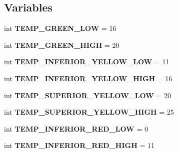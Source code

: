 \subsection*{Variables}
\begin{DoxyCompactItemize}
\item 
\mbox{\label{namespacegraph__functions_abdce6f1710c183398e9bce394c6a04cb}} 
int {\bfseries T\+E\+M\+P\+\_\+\+G\+R\+E\+E\+N\+\_\+\+L\+OW} = 16
\item 
\mbox{\label{namespacegraph__functions_a8d464961e9217805d26bb0a8985d6bf5}} 
int {\bfseries T\+E\+M\+P\+\_\+\+G\+R\+E\+E\+N\+\_\+\+H\+I\+GH} = 20
\item 
\mbox{\label{namespacegraph__functions_a0d0e29e53942695dd4949552b0214d70}} 
int {\bfseries T\+E\+M\+P\+\_\+\+I\+N\+F\+E\+R\+I\+O\+R\+\_\+\+Y\+E\+L\+L\+O\+W\+\_\+\+L\+OW} = 11
\item 
\mbox{\label{namespacegraph__functions_a6b6d4b0c7c88edb927ef234701ae21c7}} 
int {\bfseries T\+E\+M\+P\+\_\+\+I\+N\+F\+E\+R\+I\+O\+R\+\_\+\+Y\+E\+L\+L\+O\+W\+\_\+\+H\+I\+GH} = 16
\item 
\mbox{\label{namespacegraph__functions_af4b14f12932fa5e9071ab1837591b593}} 
int {\bfseries T\+E\+M\+P\+\_\+\+S\+U\+P\+E\+R\+I\+O\+R\+\_\+\+Y\+E\+L\+L\+O\+W\+\_\+\+L\+OW} = 20
\item 
\mbox{\label{namespacegraph__functions_a62a8ecb30f644710113eb6712802c402}} 
int {\bfseries T\+E\+M\+P\+\_\+\+S\+U\+P\+E\+R\+I\+O\+R\+\_\+\+Y\+E\+L\+L\+O\+W\+\_\+\+H\+I\+GH} = 25
\item 
\mbox{\label{namespacegraph__functions_a3d79a7a2632580cf0150210fb00b9b37}} 
int {\bfseries T\+E\+M\+P\+\_\+\+I\+N\+F\+E\+R\+I\+O\+R\+\_\+\+R\+E\+D\+\_\+\+L\+OW} = 0
\item 
\mbox{\label{namespacegraph__functions_a07eca342afbb9c3ea67d1a5913675d76}} 
int {\bfseries T\+E\+M\+P\+\_\+\+I\+N\+F\+E\+R\+I\+O\+R\+\_\+\+R\+E\+D\+\_\+\+H\+I\+GH} = 11
\item 
\mbox{\label{namespacegraph__functions_a65209988ade8c840c5e1a79a87c920ce}} 

\end{DoxyCompactItemize}
